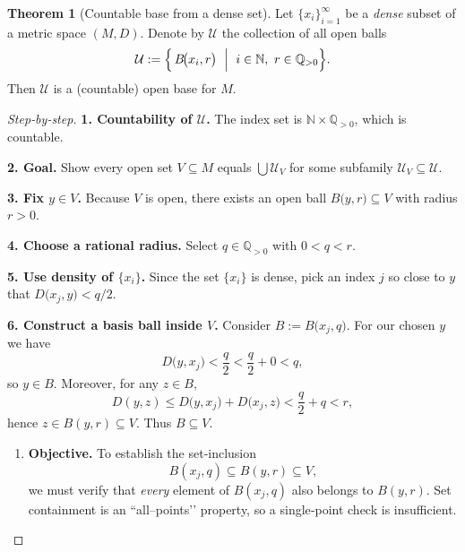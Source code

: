\documentclass[12pt]{article}
\theoremstyle{definition} %
\newtheorem{theorem}{Theorem}
\theoremstyle{plain} %
\begin{document}
\bigskip
\begin{theorem}[Countable base from a dense set]\label{thm:countable_base}
    Let $\{x_i\}_{i=1}^{\infty}$ be a \emph{dense} subset of a metric space
    $(M,D)$.  
    Denote by $\mathcal U$ the collection of all open balls
    \[
        \mathcal U
        :=\Bigl\{\,B\!\bigl(x_i,r\bigr)\ \Bigm|\ 
            i\in\mathbb N,\ r\in\mathbb Q_{>0}\Bigr\}.
    \]
    Then $\mathcal U$ is a (countable) open base for $M$.
\end{theorem}

\begin{proof}[Step‑by‑step]
    \textbf{1.  Countability of $\mathcal U$.}\;
    The index set is $\mathbb N\times\mathbb Q_{>0}$, which is countable.

    \medskip
    \textbf{2.  Goal.}\;
    Show every open set $V\subseteq M$ equals
    $\displaystyle\bigcup\mathcal U_V$ for some subfamily
    $\mathcal U_V\subseteq\mathcal U$.

    \medskip
    \textbf{3.  Fix $y\in V$.}\;
    Because $V$ is open, there exists an open ball
    $B\bigl(y,r\bigr)\subseteq V$ with radius $r>0$.

    \medskip
    \textbf{4.  Choose a rational radius.}\;
    Select $q\in\mathbb Q_{>0}$ with $0<q<r$.

    \medskip
    \textbf{5.  Use density of $\{x_i\}$.}\;
    Since the set $\{x_i\}$ is dense, pick an index $j$ so close to $y$
    that $D\!\bigl(x_j,y\bigr)<q/2$.

    \medskip
    \textbf{6.  Construct a basis ball inside $V$.}\;
    Consider $B:=B\!\bigl(x_j,q\bigr)$.  
    For our chosen $y$ we have
    \[
        D\!\bigl(y,x_j\bigr)<\frac{q}{2}<\frac{q}{2}+0<q,
    \]
    so $y\in B$.  
    Moreover, for any $z\in B$,
    \[
        D(y,z)\le D\!\bigl(y,x_j\bigr) + D\!\bigl(x_j,z\bigr)
                 < \frac{q}{2} + q
                 < r,
    \]
    hence $z\in B(y,r)\subseteq V$.  
    Thus $B\subseteq V$.

\begin{enumerate}
  \item \textbf{Objective.}  
        To establish the set‐inclusion  
        \[
            B(x_j,q)\subseteq B(y,r)\subseteq V,
        \]
        we must verify that \emph{every} element of \(B(x_j,q)\) also belongs
        to \(B(y,r)\).  Set containment is an “all–points’’ property, so a
        single‐point check is insufficient.


\end{enumerate}
\end{proof}
\end{document}
